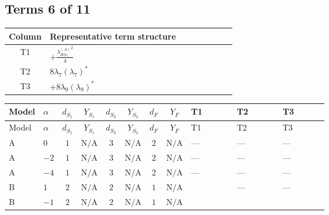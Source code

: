 \documentclass[8pt]{article}
\begin{document}
\begin{landscape}
\subsection*{Terms 6 of 11}
\begin{center}
\begin{tabular}{@{}c >{\raggedright\arraybackslash}p{0.82\linewidth}@{}}
\toprule
Column & Representative term structure \\
\midrule
T1 & \(\displaystyle +\frac{{\lambda_{HS_1}^{(A)}}^2}{4}\) \\
\midrule
T2 & \(\displaystyle 8 {\lambda_{7}} \left({\lambda_{7}}\right)^{*}\) \\
\midrule
T3 & \(\displaystyle +8 {\lambda_{9}} \left({\lambda_{9}}\right)^{*}\) \\
\midrule
\bottomrule
\end{tabular}
\end{center}
\smallskip
\tiny
\begin{longtable}{@{}llcccccc >{\raggedright\arraybackslash}p{0.21\linewidth} >{\raggedright\arraybackslash}p{0.21\linewidth} >{\raggedright\arraybackslash}p{0.21\linewidth}@{}}
\toprule
Model & $\alpha$ & $d_{S_1}$ & $Y_{S_1}$ & $d_{S_2}$ & $Y_{S_2}$ & $d_F$ & $Y_F$ & T1 & T2 & T3 \\
\midrule
\endfirsthead
\toprule
Model & $\alpha$ & $d_{S_1}$ & $Y_{S_1}$ & $d_{S_2}$ & $Y_{S_2}$ & $d_F$ & $Y_F$ & T1 & T2 & T3 \\
\midrule
\endhead
A & $0$ & $1$ & $\text{N/A}$ & $3$ & $\text{N/A}$ & $2$ & $\text{N/A}$ & --- & --- & --- \\
\midrule
A & $-2$ & $1$ & $\text{N/A}$ & $3$ & $\text{N/A}$ & $2$ & $\text{N/A}$ & --- & --- & --- \\
\midrule
A & $-4$ & $1$ & $\text{N/A}$ & $3$ & $\text{N/A}$ & $2$ & $\text{N/A}$ & --- & --- & --- \\
\midrule
B & $1$ & $2$ & $\text{N/A}$ & $2$ & $\text{N/A}$ & $1$ & $\text{N/A}$ & \scriptsize\adjustbox{max width=\linewidth}{$\begin{gathered} +\frac{{\lambda_{HS_1}^{(A)}}^2}{4}\end{gathered}$} & --- & --- \\
\midrule
B & $-1$ & $2$ & $\text{N/A}$ & $2$ & $\text{N/A}$ & $1$ & $\text{N/A}$ & \scriptsize\adjustbox{max width=\linewidth}{$\begin{gathered} +\frac{{\lambda_{HS_1}^{(A)}}^2}{4}\end{gathered}$} & \scriptsize\adjustbox{max width=\linewidth}{$\begin{gathered} 8 {\lambda_{7}} \left({\lambda_{7}}\right)^{*}\end{gathered}$} & \scriptsize\adjustbox{max width=\linewidth}{$\begin{gathered} +8 {\lambda_{9}} \left({\lambda_{9}}\right)^{*}\end{gathered}$} \\

\end{longtable}
\end{landscape}
\end{document}
